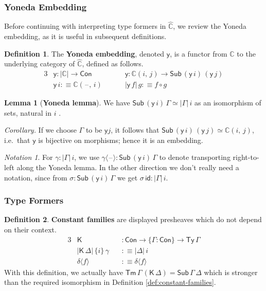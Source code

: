 \documentclass[12pt,a4paper,twoside,openany]{book}
\theoremstyle{remark}
\newtheorem{notation}{Notation}
\theoremstyle{definition}
\newtheorem{mydefinition}{Definition}
\newtheorem{mylemma}{Lemma}
\newcommand{\ms}[1]{\mathsf{#1}}
\newcommand{\mbb}[1]{\mathbb{#1}}
\newcommand{\id}{\mathsf{id}}
\newcommand{\Con}{\mathsf{Con}}
\newcommand{\Sub}{\mathsf{Sub}}
\newcommand{\Tm}{\mathsf{Tm}}
\newcommand{\Ty}{\mathsf{Ty}}
\newcommand{\blank}{\mathord{\hspace{1pt}\text{--}\hspace{1pt}}}
\newcommand{\K}{\mathsf{K}}
\newcommand{\mbbC}{\mbb{C}}
\newcommand{\hmbbC}{\hat{\mbb{C}}}
\newcommand{\lab}{\langle}
\newcommand{\rab}{\rangle}
\newcommand{\defn}{:\equiv}
\newcommand{\yon}{\ms{y}}
\begin{document}
\subsubsection{Yoneda Embedding}

Before continuing with interpreting type formers in $\hmbbC$, we review the
Yoneda embedding, as it is useful in subsequent definitions.

\begin{mydefinition}
The \textbf{Yoneda embedding}, denoted $\ms{y}$, is a functor from $\mbbC$ to
the underlying category of $\hmbbC$, defined as follows.
\begin{alignat*}{3}
  & \yon : |\mbbC| \to \Con \hspace{3em}&& \yon : \mbbC(i,\,j) \to \Sub\,(\yon\,i)\,(\yon\,j)\\
  & \yon\,i \defn \mbbC(\blank,\,i) && |\yon\,f|\,g \defn f \circ g
\end{alignat*}
\end{mydefinition}

\begin{mylemma}[\textbf{Yoneda lemma}] We have $\Sub\,(\yon\,i)\,\Gamma \simeq |\Gamma|\,i$ as an isomorphism of sets, natural in $i$ \cite{TODO}.
\end{mylemma}

\noindent\emph{Corollary.} If we choose $\Gamma$ to be $\yon j$, it follows that
$\Sub\,(\yon\,i)\,(\yon\,j) \simeq \mbbC(i,\,j)$, i.e.\ that $\yon$ is
bijective on morphisms; hence it is an embedding.

\begin{notation}
\label{not:yoneda}
For $\gamma : |\Gamma|\,i$, we use $\gamma\lab \blank \rab :
\Sub\,(\yon\,i)\,\Gamma $ to denote transporting right-to-left along the Yoneda
lemma. In the other direction we don't really need a notation, since from
$\sigma : \Sub\,(\yon\,i)\,\Gamma$ we get $\sigma\,\id : |\Gamma|\,i$.
\end{notation}

\subsubsection{Type Formers}

\begin{mydefinition}
\textbf{Constant families} are displayed presheaves which do not depend on their context.
\begin{alignat*}{3}
  & \K &&: \Con \to \{\Gamma : \Con \} \to \Ty\,\Gamma\\
  & |\K\,\Delta|\,\{i\}\,\gamma\,&&\defn |\Delta|\,i \\
  & \delta\lab f \rab &&\defn \delta \lab f \rab
\end{alignat*}
With this definition, we actually have $\Tm\,\Gamma\,(\K\,\Delta) =
\Sub\,\Gamma\,\Delta$ which is stronger than the required isomorphism in
Definition \ref{def:constant-families}.
\end{mydefinition}
\end{document}
